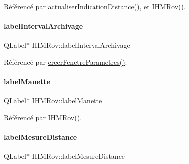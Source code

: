 Référencé par \hyperlink{class_i_h_m_rov_a7e55a10ef08b8a771fa692ec1d150d33}{actualiser\+Indication\+Distance()}, et \hyperlink{class_i_h_m_rov_a5dac1fb4612866cc61f699a415e0ef6b}{I\+H\+M\+Rov()}.

\mbox{\label{class_i_h_m_rov_a42fb93c9764bfc2fe81ba65fc02d8de2}} 
\paragraph{\texorpdfstring{label\+Interval\+Archivage}{labelIntervalArchivage}}
{\footnotesize\ttfamily Q\+Label$\ast$ I\+H\+M\+Rov\+::label\+Interval\+Archivage\hspace{0.3cm}{\ttfamily [private]}}



Référencé par \hyperlink{class_i_h_m_rov_aed451139ac09ef18b7c92637761d80ce}{creer\+Fenetre\+Parametres()}.

\mbox{\label{class_i_h_m_rov_a93259ab27f1eeeacbfe3048a58f475b1}} 
\paragraph{\texorpdfstring{label\+Manette}{labelManette}}
{\footnotesize\ttfamily Q\+Label$\ast$ I\+H\+M\+Rov\+::label\+Manette\hspace{0.3cm}{\ttfamily [private]}}



Référencé par \hyperlink{class_i_h_m_rov_a5dac1fb4612866cc61f699a415e0ef6b}{I\+H\+M\+Rov()}.

\mbox{\label{class_i_h_m_rov_a39ff04b1880aa20941716cf7a6e1b8d8}} 
\paragraph{\texorpdfstring{label\+Mesure\+Distance}{labelMesureDistance}}
{\footnotesize\ttfamily Q\+Label$\ast$ I\+H\+M\+Rov\+::label\+Mesure\+Distance\hspace{0.3cm}{\ttfamily [private]}}



